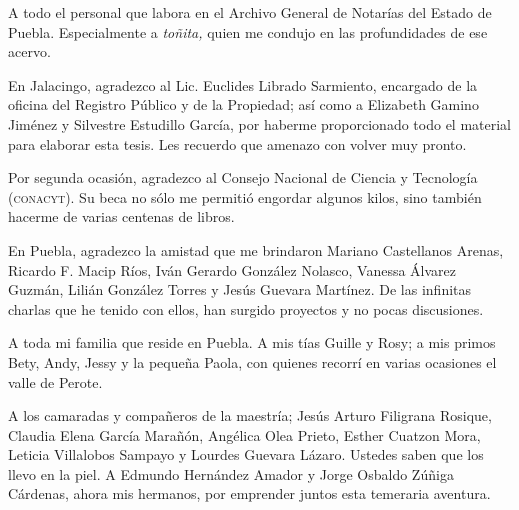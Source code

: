 \documentclass[14pt,twoside,final]{extbook} %
\begin{document}
A todo el personal que labora en el Archivo General de Notarías del Estado de Puebla. Especialmente a \emph{toñita,} quien me condujo en las profundidades de ese acervo.

En Jalacingo, agradezco al Lic. Euclides Librado Sarmiento, encargado de la oficina del Registro Público y de la Propiedad; así como a Elizabeth Gamino Jiménez y Silvestre Estudillo García, por haberme proporcionado todo el material para elaborar esta tesis. Les recuerdo que amenazo con volver muy pronto.

Por segunda ocasión, agradezco al Consejo Nacional de Ciencia y Tecnología (\textsc{conacyt}). Su beca no sólo me permitió engordar algunos kilos, sino también hacerme de varias centenas de libros.

En Puebla, agradezco la amistad que me brindaron Mariano Castellanos Arenas, Ricardo F. Macip Ríos, Iván Gerardo González Nolasco, Vanessa Álvarez Guzmán, Lilián González Torres y Jesús Guevara Martínez. De las infinitas charlas que he tenido con ellos, han surgido proyectos y no pocas discusiones.

A toda mi familia que reside en Puebla. A mis tías Guille y Rosy; a mis primos Bety, Andy, Jessy y la pequeña Paola, con quienes recorrí en varias ocasiones el valle de Perote.

A los camaradas y compañeros de la maestría; Jesús Arturo Filigrana Rosique, Claudia Elena García Marañón, Angélica Olea Prieto, Esther Cuatzon Mora, Leticia Villalobos Sampayo y Lourdes Guevara Lázaro. Ustedes saben que los llevo en la piel. A Edmundo Hernández Amador y Jorge Osbaldo Zúñiga Cárdenas, ahora mis hermanos, por emprender juntos esta temeraria aventura.
\end{document}
